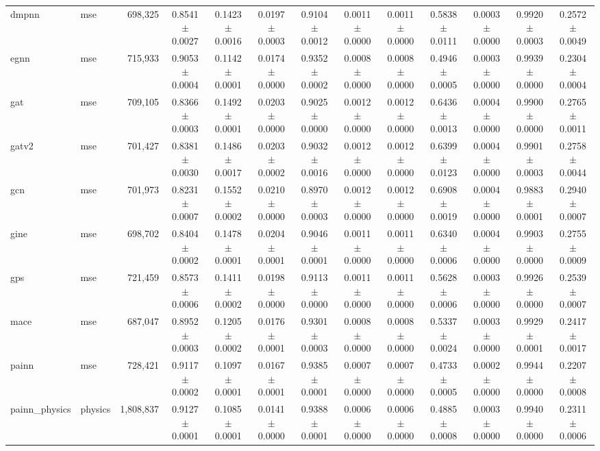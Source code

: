 \begin{tabular}{llrcccccccccc}
dmpnn & mse & 698,325 & 0.8541 $\pm$ 0.0027 & 0.1423 $\pm$ 0.0016 & 0.0197 $\pm$ 0.0003 & 0.9104 $\pm$ 0.0012 & 0.0011 $\pm$ 0.0000 & 0.0011 $\pm$ 0.0000 & 0.5838 $\pm$ 0.0111 & 0.0003 $\pm$ 0.0000 & 0.9920 $\pm$ 0.0003 & 0.2572 $\pm$ 0.0049 \\
egnn & mse & 715,933 & 0.9053 $\pm$ 0.0004 & 0.1142 $\pm$ 0.0001 & 0.0174 $\pm$ 0.0000 & 0.9352 $\pm$ 0.0002 & 0.0008 $\pm$ 0.0000 & 0.0008 $\pm$ 0.0000 & 0.4946 $\pm$ 0.0005 & 0.0003 $\pm$ 0.0000 & 0.9939 $\pm$ 0.0000 & 0.2304 $\pm$ 0.0004 \\
gat & mse & 709,105 & 0.8366 $\pm$ 0.0003 & 0.1492 $\pm$ 0.0001 & 0.0203 $\pm$ 0.0000 & 0.9025 $\pm$ 0.0000 & 0.0012 $\pm$ 0.0000 & 0.0012 $\pm$ 0.0000 & 0.6436 $\pm$ 0.0013 & 0.0004 $\pm$ 0.0000 & 0.9900 $\pm$ 0.0000 & 0.2765 $\pm$ 0.0011 \\
gatv2 & mse & 701,427 & 0.8381 $\pm$ 0.0030 & 0.1486 $\pm$ 0.0017 & 0.0203 $\pm$ 0.0002 & 0.9032 $\pm$ 0.0016 & 0.0012 $\pm$ 0.0000 & 0.0012 $\pm$ 0.0000 & 0.6399 $\pm$ 0.0123 & 0.0004 $\pm$ 0.0000 & 0.9901 $\pm$ 0.0003 & 0.2758 $\pm$ 0.0044 \\
gcn & mse & 701,973 & 0.8231 $\pm$ 0.0007 & 0.1552 $\pm$ 0.0002 & 0.0210 $\pm$ 0.0000 & 0.8970 $\pm$ 0.0003 & 0.0012 $\pm$ 0.0000 & 0.0012 $\pm$ 0.0000 & 0.6908 $\pm$ 0.0019 & 0.0004 $\pm$ 0.0000 & 0.9883 $\pm$ 0.0001 & 0.2940 $\pm$ 0.0007 \\
gine & mse & 698,702 & 0.8404 $\pm$ 0.0002 & 0.1478 $\pm$ 0.0001 & 0.0204 $\pm$ 0.0001 & 0.9046 $\pm$ 0.0001 & 0.0011 $\pm$ 0.0000 & 0.0011 $\pm$ 0.0000 & 0.6340 $\pm$ 0.0006 & 0.0004 $\pm$ 0.0000 & 0.9903 $\pm$ 0.0000 & 0.2755 $\pm$ 0.0009 \\
gps & mse & 721,459 & 0.8573 $\pm$ 0.0006 & 0.1411 $\pm$ 0.0002 & 0.0198 $\pm$ 0.0000 & 0.9113 $\pm$ 0.0000 & 0.0011 $\pm$ 0.0000 & 0.0011 $\pm$ 0.0000 & 0.5628 $\pm$ 0.0006 & 0.0003 $\pm$ 0.0000 & 0.9926 $\pm$ 0.0000 & 0.2539 $\pm$ 0.0007 \\
mace & mse & 687,047 & 0.8952 $\pm$ 0.0003 & 0.1205 $\pm$ 0.0002 & 0.0176 $\pm$ 0.0001 & 0.9301 $\pm$ 0.0003 & 0.0008 $\pm$ 0.0000 & 0.0008 $\pm$ 0.0000 & 0.5337 $\pm$ 0.0024 & 0.0003 $\pm$ 0.0000 & 0.9929 $\pm$ 0.0001 & 0.2417 $\pm$ 0.0017 \\
painn & mse & 728,421 & 0.9117 $\pm$ 0.0002 & 0.1097 $\pm$ 0.0001 & 0.0167 $\pm$ 0.0001 & 0.9385 $\pm$ 0.0001 & 0.0007 $\pm$ 0.0000 & 0.0007 $\pm$ 0.0000 & 0.4733 $\pm$ 0.0005 & 0.0002 $\pm$ 0.0000 & 0.9944 $\pm$ 0.0000 & 0.2207 $\pm$ 0.0008 \\
painn\_physics & physics & 1,808,837 & 0.9127 $\pm$ 0.0001 & 0.1085 $\pm$ 0.0001 & 0.0141 $\pm$ 0.0000 & 0.9388 $\pm$ 0.0001 & 0.0006 $\pm$ 0.0000 & 0.0006 $\pm$ 0.0000 & 0.4885 $\pm$ 0.0008 & 0.0003 $\pm$ 0.0000 & 0.9940 $\pm$ 0.0000 & 0.2311 $\pm$ 0.0006 \\

\end{tabular}
